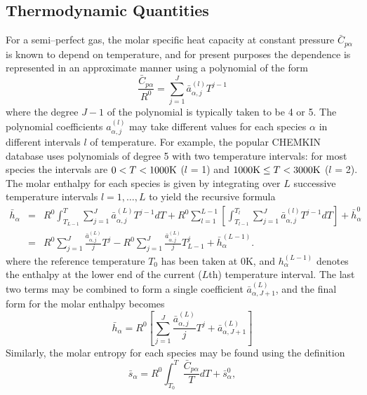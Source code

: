 \documentclass[dvips]{article}
\begin{document}
\subsection{Thermodynamic Quantities}
For a semi--perfect gas, the molar specific heat capacity at constant pressure
$\bar{C}_{p\alpha}$
is known to depend on temperature, and for present purposes the dependence is 
represented in an approximate manner using a polynomial of the form
\begin{equation}
\frac{\bar{C}_{p\alpha}}{R^{0}}
= \sum_{j=1}^{J} \bar{a}_{\alpha,j}^{(l)}T^{j-1}
\label{CPPOLY}
\end{equation}
where the degree $J-1$ of the polynomial is typically taken to be 4 or 5.
The polynomial coefficients $a_{\alpha,j}^{(l)}$ may take different values
for each species $\alpha$ in different intervals $l$ of temperature.
For example, the popular CHEMKIN database \cite{Chemkin} uses
polynomials of degree 5 with two temperature
intervals: for most species the intervals are $0 < T < 1000{\rm K}$ ($l$ = 1)
and $1000{\rm K} \le T < 3000{\rm K}$ ($l$ = 2).  The molar enthalpy
for each species is
given by integrating over $L$ successive temperature intervals
$l=1,\ldots,L$ to yield the recursive formula
\begin{eqnarray}
\bar{h}_{\alpha}
& = & R^{0}\int_{T_{L-1}}^{T} \sum_{j=1}^{J} \bar{a}_{\alpha,j}^{(L)}T^{j-1}dT
+ R^{0}\sum_{l=1}^{L-1}\left[
\int_{T_{l-1}}^{T_{l}}\sum_{j=1}^{J}\bar{a}_{\alpha,j}^{(l)}T^{j-1}dT
\right]
+ \bar{h}_{\alpha}^{0} \nonumber\\
& = & R^{0}\sum_{j=1}^{J} \frac{\bar{a}_{\alpha,j}^{(L)}}{j}T^{j} -
R^{0}\sum_{j=1}^{J} \frac{\bar{a}_{\alpha,j}^{(L)}}{j}T_{L-1}^{j} +
\bar{h}_{\alpha}^{(L-1)}.
\end{eqnarray}
where the reference temperature $T_{0}$ has been taken at 0K, and 
$h_{\alpha}^{(L-1)}$ denotes the enthalpy at the lower end of the current
($L$th) temperature interval.
The last two terms may be combined to form a single coefficient
$\bar{a}_{\alpha,J+1}^{(L)}$, and the final form for the molar enthalpy
becomes
\begin{equation}
\bar{h}_{\alpha} = R^{0}\left[
\sum_{j=1}^{J} \frac{\bar{a}_{\alpha,j}^{(L)}}{j}T^{j}
+ \bar{a}_{\alpha,J+1}^{(L)}
\right]
\label{ENTHMOL}
\end{equation}
Similarly, the molar entropy for each species may be found using the definition
\begin{equation}
\bar{s}_{\alpha} = R^{0}\int_{T_{0}}^{T} \frac{\bar{C}_{p\alpha}}{T} dT
+ \bar{s}_{\alpha}^{0}, 
\end{equation}
\end{document}
